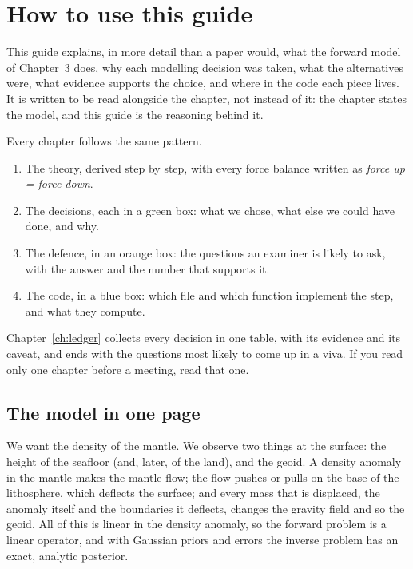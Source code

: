 \chapter*{How to use this guide}

This guide explains, in more detail than a paper would, what the forward model of Chapter~3 does, why each modelling decision was taken, what the alternatives were, what evidence supports the choice, and where in the code each piece lives.
It is written to be read alongside the chapter, not instead of it: the chapter states the model, and this guide is the reasoning behind it.

Every chapter follows the same pattern.
\begin{enumerate}[nosep]
\item The theory, derived step by step, with every force balance written as \emph{force up = force down}.
\item The decisions, each in a green box: what we chose, what else we could have done, and why.
\item The defence, in an orange box: the questions an examiner is likely to ask, with the answer and the number that supports it.
\item The code, in a blue box: which file and which function implement the step, and what they compute.
\end{enumerate}

Chapter~\ref{ch:ledger} collects every decision in one table, with its evidence and its caveat, and ends with the questions most likely to come up in a viva.
If you read only one chapter before a meeting, read that one.

\section*{The model in one page}

We want the density of the mantle.
We observe two things at the surface: the height of the seafloor (and, later, of the land), and the geoid.
A density anomaly in the mantle makes the mantle flow; the flow pushes or pulls on the base of the lithosphere, which deflects the surface; and every mass that is displaced, the anomaly itself and the boundaries it deflects, changes the gravity field and so the geoid.
All of this is linear in the density anomaly, so the forward problem is a linear operator, and with Gaussian priors and errors the inverse problem has an exact, analytic posterior.


